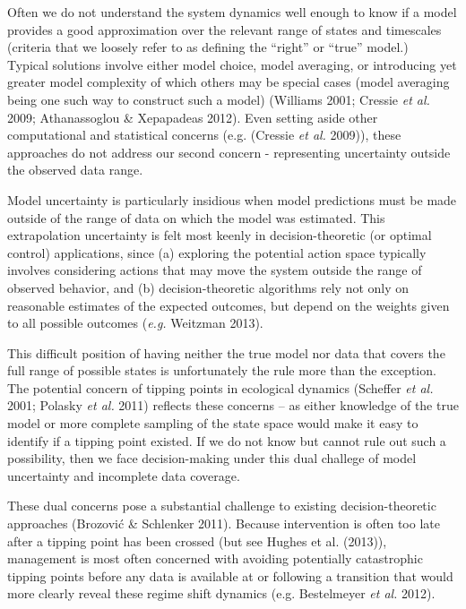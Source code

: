 \documentclass[author-year, 12pt,review]{elsarticle} %
\begin{document}
Often we do not understand the system dynamics well enough to know if a
model provides a good approximation over the relevant range of states
and timescales (criteria that we loosely refer to as defining the
``right'' or ``true'' model.)\\Typical solutions involve either model
choice, model averaging, or introducing yet greater model complexity of
which others may be special cases (model averaging being one such way to
construct such a model) (Williams 2001; Cressie \emph{et al.} 2009;
Athanassoglou \& Xepapadeas 2012). Even setting aside other
computational and statistical concerns (e.g. (Cressie \emph{et al.}
2009)), these approaches do not address our second concern -
representing uncertainty outside the observed data range.

Model uncertainty is particularly insidious when model predictions must
be made outside of the range of data on which the model was estimated.
This extrapolation uncertainty is felt most keenly in decision-theoretic
(or optimal control) applications, since (a) exploring the potential
action space typically involves considering actions that may move the
system outside the range of observed behavior, and (b)
decision-theoretic algorithms rely not only on reasonable estimates of
the expected outcomes, but depend on the weights given to all possible
outcomes (\emph{e.g.} Weitzman 2013).

This difficult position of having neither the true model nor data that
covers the full range of possible states is unfortunately the rule more
than the exception. The potential concern of tipping points in
ecological dynamics (Scheffer \emph{et al.} 2001; Polasky \emph{et al.}
2011) reflects these concerns -- as either knowledge of the true model
or more complete sampling of the state space would make it easy to
identify if a tipping point existed. If we do not know but cannot rule
out such a possibility, then we face decision-making under this dual
challege of model uncertainty and incomplete data coverage.

These dual concerns pose a substantial challenge to existing
decision-theoretic approaches (Brozović \& Schlenker 2011). Because
intervention is often too late after a tipping point has been crossed
(but see Hughes et al. (2013)), management is most often concerned with
avoiding potentially catastrophic tipping points before any data is
available at or following a transition that would more clearly reveal
these regime shift dynamics (e.g. Bestelmeyer \emph{et al.} 2012).
\end{document}
